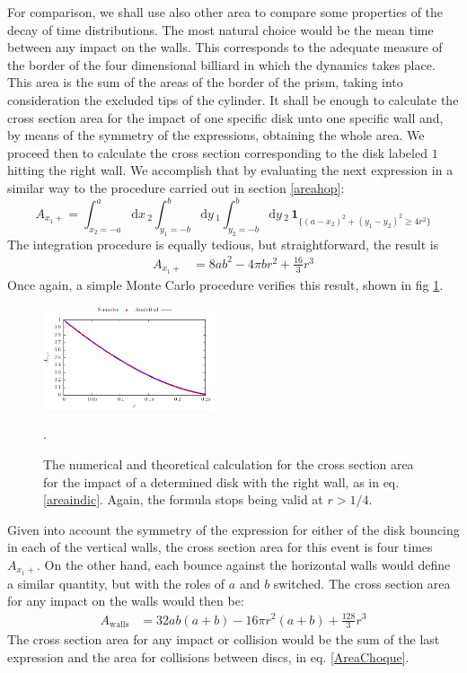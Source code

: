 \documentclass[superscriptaddress,pre,reprint,showpacs,onecolumn]{revtex4-1}
\newcommand{\rd}[1]{\mathrm{d}{#1} \,}
\newcommand{\indicator}[1]{\mathbf{1}_{ \{   #1 \} } }
\begin{document}
For comparison, we shall use also other area to compare
some properties of the decay of time distributions. The most natural choice
would be the mean time between any impact on the walls. This corresponds
to the adequate measure of the border of the four dimensional
billiard in which the dynamics takes place. This area is
the sum of the areas of the border of the
prism, taking into consideration the excluded tips of the cylinder. 
It shall be enough to calculate the cross section area for
the impact of one specific disk unto one specific wall and,
by means of the symmetry of the expressions, obtaining the whole
area. We proceed then to calculate the cross section corresponding to 
the disk labeled $1$ hitting the right wall. We accomplish that by
evaluating the next expression in a similar way to
the procedure carried out in section \ref{areahop}:
\begin{equation}\label{areaindic}
 A_{x_1+} =  \int_{x_2 = -a}^a \rd x_2 
\int_{y_1 = -b}^b \rd y_1 \int_{y_2 = -b}^b \rd y_2 \, \indicator{ (a-x_2)^2 + (y_1-y_2)^2 \ge 4 r^2 }
\end{equation}
The integration procedure is equally tedious, but
straightforward, the result is 
\begin{align}\label{areax1p}
 A_{x_1+} & = 8 a b^2-4  \pi b r^2 +\frac{16}{3}r^3 
\end{align}
Once again, a simple Monte Carlo procedure verifies this result,
shown in fig \ref{area1derecha}. 

\begin{figure}
\centering
\includegraphics[width=0.45\textwidth]{./FigurasPerfectas/AreaParedx1Positiva02.pdf}
\caption{The numerical and theoretical calculation for the cross section area
for the impact of a determined disk with the right wall, as in eq. \ref{areaindic}.
Again, the formula stops being valid at $r>1/4$. }
\label{area1derecha}.
\end{figure}

Given into account the symmetry of the expression for either of 
the disk bouncing in each of the vertical walls, the
cross section area for this event is four times $A_{x_1+}$. On
the other hand, each bounce against the horizontal walls would
define a similar quantity, but with the roles of $a$ and $b$ switched.
The cross section area for any impact on the walls would then be:
\begin{align}\label{areawalls}
 A_\text{walls} & = 32 a b (a+b)-16 \pi r^2 (a+b) +\frac{128}{3}r^3 
\end{align}
The cross section area for any impact or collision 
would be  the sum of the last expression
and the area for collisions between discs, in eq. \ref{AreaChoque}.
\end{document}

